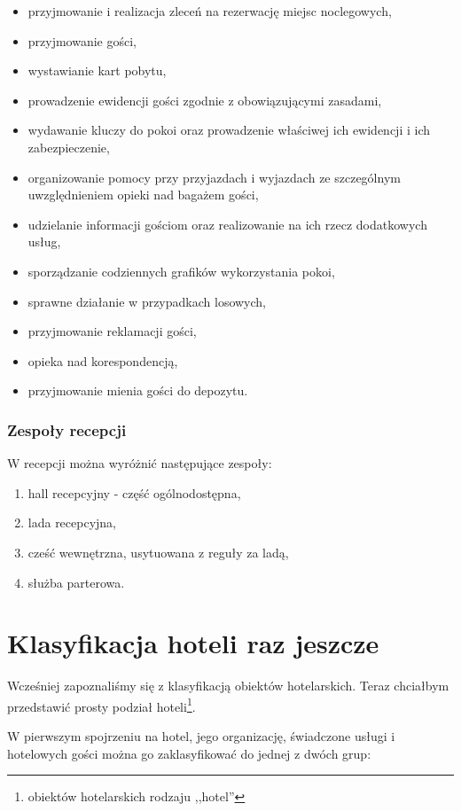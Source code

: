 \documentclass[a4paper,onecolumn,oneside,11pt,wide,floatssmall]{mwrep}
\theoremstyle{definition}
\theoremstyle{plain}%
\theoremstyle{remark}
\begin{document}
\begin{itemize}
  \item przyjmowanie i realizacja zleceń na rezerwację miejsc noclegowych,
  \item przyjmowanie gości,
  \item wystawianie kart pobytu,
  \item prowadzenie ewidencji gości zgodnie z obowiązującymi zasadami,
  \item wydawanie kluczy do pokoi oraz prowadzenie właściwej ich ewidencji i 
  ich zabezpieczenie,
  \item organizowanie pomocy przy przyjazdach i wyjazdach ze szczególnym 
  uwzględnieniem opieki nad bagażem gości,
  \item udzielanie informacji gościom oraz realizowanie na ich rzecz 
  dodatkowych usług,
  \item sporządzanie codziennych grafików wykorzystania pokoi,
  \item sprawne działanie w przypadkach losowych,
  \item przyjmowanie reklamacji gości,
  \item opieka nad korespondencją,
  \item przyjmowanie mienia gości do depozytu.
\end{itemize}

\subsubsection{Zespoły recepcji}
W recepcji można wyróżnić następujące zespoły\cite[str. 8-10]{hotel2:part1}:
\begin{enumerate}
  \item hall recepcyjny - część ogólnodostępna,
  \item lada recepcyjna,
  \item cześć wewnętrzna, usytuowana z reguły za ladą,
  \item służba parterowa.
\end{enumerate}

\section{Klasyfikacja hoteli raz jeszcze}
Wcześniej zapoznaliśmy się z klasyfikacją obiektów hotelarskich. Teraz 
chciałbym przedstawić prosty podział hoteli\footnote{obiektów hotelarskich 
rodzaju ,,hotel''}.

W pierwszym spojrzeniu na hotel, jego organizację, świadczone usługi i 
hotelowych gości można go zaklasyfikować do jednej z dwóch grup:
\end{document}
